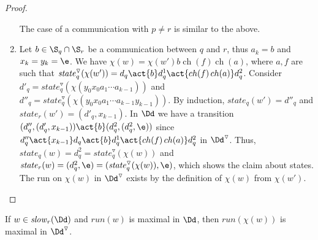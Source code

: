 \documentclass[10pt,a4paper]{article}
\newcommand{\run}{\mathit{run}}
\newcommand{\red}[1]{#1^\triangledown}
\newcommand{\slow}{\mathit{slow}}
\newcommand{\state}{\mathit{state}}
\newcommand{\ch}{\mathop{ch}}
\begin{document}
\begin{proof}
\begin{enumerate}
The case of a communication with $p\not=r$ is similar to the above.
\item Let $b \in \S_q \cap \S_r$ be a communication between $q$ and
  $r$, thus $a_k=b$ and $x_k=y_k=\e$. We have $\chi(w)=\chi(w') b
  \ch(f) \ch(a)$, where $a,f$ are such that
  $\red\state_q(\chi(w'))=d_q \act{b} d^1_q \act{\ch(f)\ch(a)}
  d^2_q$. Consider $d'_q=\red\state_q(\chi(y_0x_0a_1 \cdots a_{k-1}))$ and
  $d''_q=\red\state_q(\chi(y_0x_0a_1 \cdots a_{k-1}y_{k-1}))$. By
  induction, $\state_q(w')=d''_q$ and $\state_r(w')=(d'_q,x_{k-1})$.
  In $\Dd$ we have a transition $(d''_q,(d'_q,x_{k-1})) \act{b}
  (d^2_q,(d^2_q,\e))$ since $d''_q \act{x_{k-1}} d_q \act{b} d^1_q
  \act{\ch(f)\ch(a)} d^2_q$ in $\red\Dd$. Thus,
  $\state_q(w)=d^2_q=\red\state_q(\chi(w))$ and
  $\state_r(w)=(d^2_q,\e)=(\red\state_q(\chi(w)),\e)$, which shows the
  claim about states. The run on $\chi(w)$ in $\red\Dd$ exists by the
  definition of $\chi(w)$ from $\chi(w')$.
\end{enumerate}
\end{proof}



\begin{lemma}\label{D: maximal}
  If $w \in \slow_r(\Dd)$ and $\run(w)$ is maximal in $\Dd$, then
  $\run(\chi(w))$ is maximal in $\red \Dd$.
\end{lemma}
\end{document}
